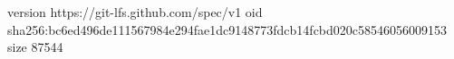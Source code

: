 version https://git-lfs.github.com/spec/v1
oid sha256:bc6ed496de111567984e294fae1dc9148773fdcb14fcbd020c58546056009153
size 87544
